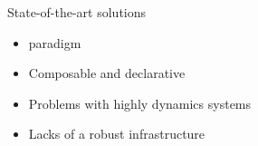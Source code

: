 \begin{frame}{State-of-the-art solutions}
  \begin{card}
    \begin{itemize}
      \item[\faThumbsUp]  paradigm
      \item[\faThumbsUp] Composable and declarative 
      \item[{\color{materialRed} \faThumbsDown}] Problems with highly dynamics systems
      \item[{\color{materialRed} \faThumbsDown}] Lacks of a robust infrastructure
    \end{itemize}
  \end{card}

  \begin{columns}
    \begin{column}{0.25\textwidth}
    \end{column}
    \begin{column}{0.25\textwidth}
    \end{column}
  \end{columns}
\end{frame}